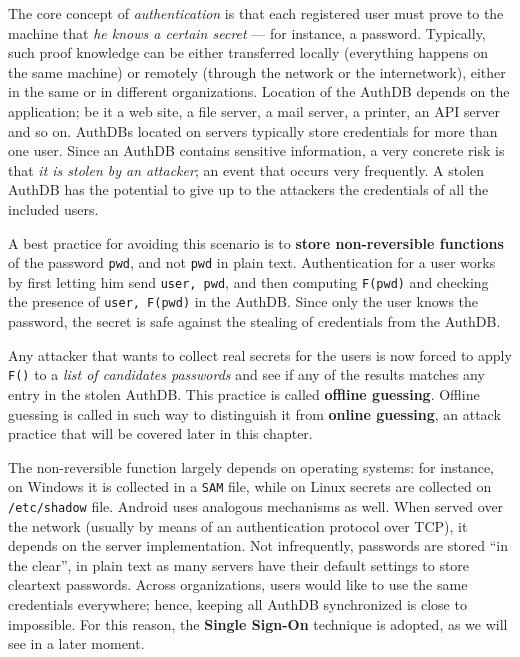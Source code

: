 \documentclass[10pt]{extreport}
\begin{document}
The core concept of \emph{authentication} is that each registered user must
prove to the machine that \emph{he knows a certain secret} --- for instance, a
password. Typically, such proof knowledge can be either transferred locally
(everything happens on the same machine) or remotely (through the network or
the internetwork), either in the same or in different organizations. Location
of the AuthDB depends on the application; be it a web site, a file server, a
mail server, a printer, an API server and so on. AuthDBs located on servers
typically store credentials for more than one user. Since an AuthDB contains
sensitive information, a very concrete risk is that \emph{it is stolen by an
attacker}; an event that occurs very frequently. A stolen AuthDB has the
potential to give up to the attackers the credentials of all the included
users.

A best practice for avoiding this scenario is to \textbf{store non\--reversible
functions} of the password \texttt{pwd}, and not \texttt{pwd} in plain text.
Authentication for a user works by first letting him send \texttt{user, pwd},
and then computing \texttt{F(pwd)} and checking the presence of \texttt{user,
F(pwd)} in the AuthDB. Since only the user knows the password, the secret is
safe against the stealing of credentials from the AuthDB.

Any attacker that wants to collect real secrets for the users is now forced to
apply \texttt{F()} to a \emph{list of candidates passwords} and see if any of
the results matches any entry in the stolen AuthDB. This practice is called
\textbf{offline guessing}. Offline guessing is called in such way to
distinguish it from \textbf{online guessing}, an attack practice that will be
covered later in this chapter.

The non\--reversible function largely depends on operating systems: for
instance, on Windows it is collected in a \texttt{SAM} file, while on Linux
secrets are collected on \texttt{/etc/shadow} file. Android uses analogous
mechanisms as well. When served over the network (usually by means of an
authentication protocol over TCP), it depends on the server implementation. Not
infrequently, passwords are stored ``in the clear'', in plain text as many
servers have their default settings to store cleartext passwords. Across
organizations, users would like to use the same credentials everywhere; hence,
keeping all AuthDB synchronized is close to impossible. For this reason, the
\textbf{Single Sign\--On} technique is adopted, as we will see in a later
moment.
\end{document}
